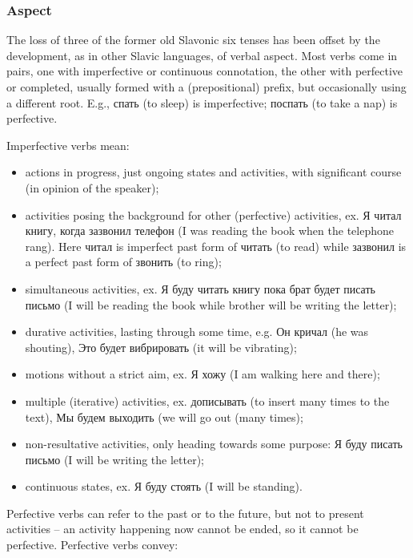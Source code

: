 \documentclass[12pt]{article}
\begin{document}
\subsubsection*{Aspect}
The loss of three of the former old Slavonic six tenses has been offset by the development, as in other Slavic languages, of verbal aspect. Most verbs come in pairs, one with imperfective or continuous connotation, the other with perfective or completed, usually formed with a (prepositional) prefix, but occasionally using a different root. E.g., спать (to sleep) is imperfective; поспать (to take a nap) is perfective.

Imperfective verbs mean:
\begin{itemize}
\item actions in progress, just ongoing states and activities, with significant course (in opinion of the speaker);
\item activities posing the background for other (perfective) activities, ex. Я читал книгу, когда зазвонил телефон (I was reading the book when the telephone rang). Here читал is imperfect past form of читать (to read) while зазвонил is a perfect past form of звонить (to ring);
\item simultaneous activities, ex. Я буду читать книгу пока брат будет писать письмо (I will be reading the book while brother will be writing the letter);
\item durative activities, lasting through some time, e.g. Он кричал (he was shouting), Это будет вибрировать (it will be vibrating);
\item motions without a strict aim, ex. Я хожу (I am walking here and there);
\item multiple (iterative) activities, ex. дописывать (to insert many times to the text), Мы будем выходить (we will go out (many times);
\item non-resultative activities, only heading towards some purpose: Я буду писать письмо (I will be writing the letter);
\item continuous states, ex. Я буду стоять (I will be standing).
\end{itemize}
Perfective verbs can refer to the past or to the future, but not to present activities – an activity happening now cannot be ended, so it cannot be perfective. Perfective verbs convey:
\end{document}
